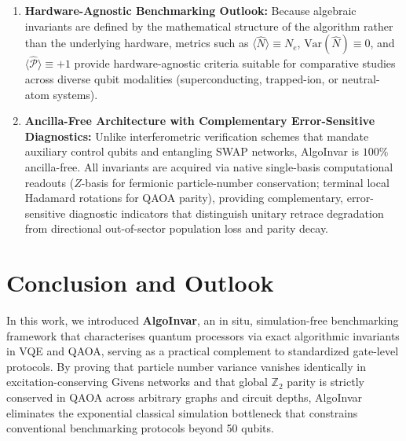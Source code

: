 \documentclass[aps,pra,reprint,superscriptaddress,floatfix,nofootinbib]{revtex4-2}
\begin{document}
\begin{enumerate}
    \item \textbf{Hardware-Agnostic Benchmarking Outlook:}
    Because algebraic invariants are defined by the mathematical structure of the algorithm rather than the underlying hardware, metrics such as $\langle \hat{N} \rangle \equiv N_e$, $\text{Var}(\hat{N}) \equiv 0$, and $\langle \hat{\mathcal{P}} \rangle \equiv +1$ provide hardware-agnostic criteria suitable for comparative studies across diverse qubit modalities (superconducting, trapped-ion, or neutral-atom systems).

    \item \textbf{Ancilla-Free Architecture with Complementary Error-Sensitive Diagnostics:}
    Unlike interferometric verification schemes that mandate auxiliary control qubits and entangling SWAP networks, AlgoInvar is $100\%$ ancilla-free. All invariants are acquired via native single-basis computational readouts ($Z$-basis for fermionic particle-number conservation; terminal local Hadamard rotations for QAOA parity), providing complementary, error-sensitive diagnostic indicators that distinguish unitary retrace degradation from directional out-of-sector population loss and parity decay.
\end{enumerate}


\section{Conclusion and Outlook}
In this work, we introduced \textbf{AlgoInvar}, an in situ, simulation-free benchmarking framework that characterises quantum processors via exact algorithmic invariants in VQE and QAOA, serving as a practical complement to standardized gate-level protocols. By proving that particle number variance vanishes identically in excitation-conserving Givens networks and that global $\mathbb{Z}_2$ parity is strictly conserved in QAOA across arbitrary graphs and circuit depths, AlgoInvar eliminates the exponential classical simulation bottleneck that constrains conventional benchmarking protocols beyond 50 qubits.
\end{document}
